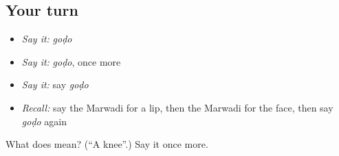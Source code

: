 \subsection*{Your turn}
\begin{itemize}
\raggedright
  \item \emph{Say it:} \emph{goḍo}
  \item \emph{Say it:} \emph{goḍo}, once more
  \item \emph{Say it:} say \emph{goḍo}
  \item \emph{Recall:} say the Marwadi for a lip, then the Marwadi for the face, then say \emph{goḍo} again
\end{itemize}

\begin{tcolorbox}[breakable,colback=teal!4,colframe=teal!35!black,title={Before you move on}]
What does  mean? (\textquotedblleft{}A knee\textquotedblright{}.) Say it once more.
\end{tcolorbox}
